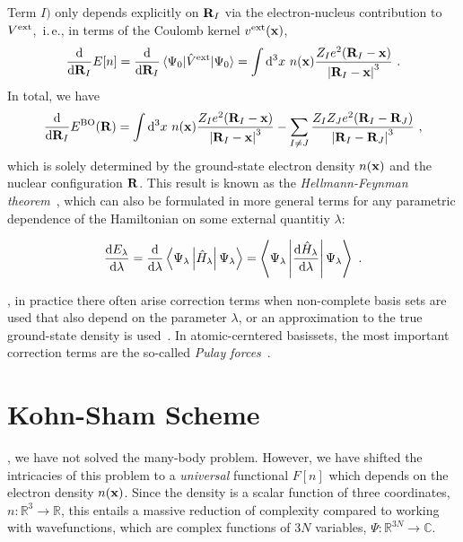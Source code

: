Term $I)$ only depends explicitly on ${\bf R}_I$ via the electron-nucleus contribution to $V^{\rm ext}$,~i.\,e., in terms of the Coulomb kernel $v^{\rm ext} ({\bf x})$,
\begin{align}
	\frac{{\rm d}}{{\rm d} {\bf R}_I} E[n]
		= \frac{{\rm d}}{{\rm d} {\bf R}_I} \braket{\Psi_0 | \hat V ^{\rm ext} | \Psi_0} 
		= \int {\rm d}^3 x ~ n({\bf x}) \frac{Z_I e^2 ({\bf R}_I - {\bf x})}{\left\lvert {\bf R}_I - {\bf x} \right\rvert^3}~.
\end{align}
In total, we have
\begin{align}
	\frac{\d}{\d {\bf R}_I} E^{\rm BO} ({\bf R})
	= \int \d^3 x ~ n({\bf x}) \frac{Z_I e^2 ({\bf R}_I - {\bf x})}{\left\lvert {\bf R}_I - {\bf x} \right\rvert^3}
	- \sum_{I \neq J} \frac{Z_I Z_J e^2 ({\b R}_{I}-{\bf R}_{J})}{
		\left\lvert {\bf R}_{I}-{\bf R}_{J} \right\rvert^3}~,
	\label{eq:hellmannfeynman.force}
\end{align}
which is solely determined by the ground-state electron density $n ({\bf x})$ and the nuclear configuration $\bf R$. This result is known as the \emph{Hellmann-Feynman theorem}~\cite{Hellmann2015,Feynman1939}, which can also be formulated in more general terms for any parametric dependence of the Hamiltonian on some external quantitiy $\lambda$:
\begin{theorem}
\begin{align}
	\frac{{\rm d} E_{\lambda}}{{\rm d} \lambda}
		= \frac{{\rm d}}{{\rm d} \lambda}\left\langle\Psi_{\lambda} \left|\hat{H}_{\lambda}\right| \Psi_{\lambda} \right\rangle
		= \left\langle\Psi_{\lambda} \left| \frac{{\rm d} \hat{H}_{\lambda}}{{\rm d} \lambda} \right| \Psi_{\lambda} \right\rangle~.
\end{align}
\end{theorem}

, in practice there often arise correction terms when non-complete basis sets are used that also depend on the parameter $\lambda$, or an approximation to the true ground-state density is used~\cite{Bendt1983,Chan1993}. In atomic-cerntered basissets, the most important correction terms are the so-called \emph{Pulay forces}~\cite{Pulay1969}.

\newpage

\section{Kohn-Sham Scheme}
, we have not solved the many-body problem. However, we have shifted the intricacies of this problem to a \emph{universal} functional $F[n]$ which depends on the electron density $n({\bf x})$. Since the density is a scalar function of three coordinates, $n: \mathds R^3 \rightarrow \mathds R$, this entails a massive reduction of complexity compared to working with wavefunctions, which are complex functions of $3N$ variables, $\Psi: \mathds R^{3N} \rightarrow \mathds C$.

